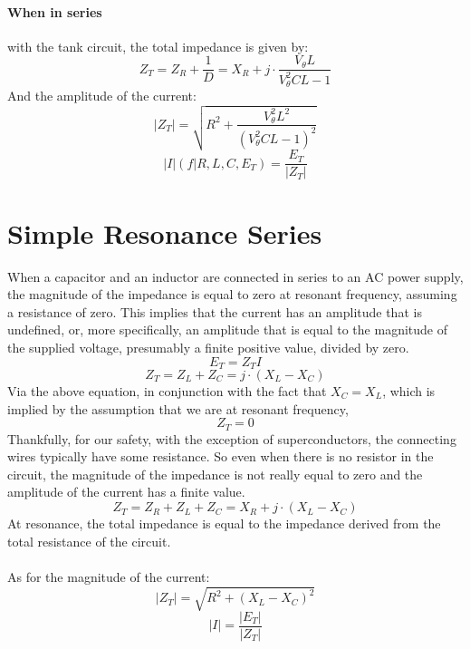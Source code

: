 \documentclass{article}
\begin{document}
	\paragraph[In Series]{When in series} with the tank circuit, the total 
	impedance is given by:
	$$ Z_T = Z_R + \frac{1}{D} = X_R  + j \cdot  \frac{V_\theta L}{V_\theta^2 
	CL -1}$$
	And the amplitude of the current:
	$$ |Z_T| = \sqrt{R^2 + \frac{V_\theta^2L^2}{(V_\theta^2CL - 1)^2}}$$
	$$ |I|(f \vert R, L, C, E_T) = \frac{E_T}{|Z_T|}$$
	\section[Series]{Simple Resonance Series}
	When a capacitor and an inductor are connected in series to an AC power 
	supply, the magnitude of the impedance is equal to zero at resonant 
	frequency, assuming a resistance of zero.  This implies that the current 
	has an amplitude that is undefined, or, more specifically, an amplitude 
	that is equal to the magnitude of the supplied voltage, presumably a finite 
	positive value, divided by zero.
	$$ E_T = Z_T I$$
	$$ Z_T = Z_L + Z_C = j \cdot (X_L - X_C)$$
	Via the above equation, in conjunction with the fact that $X_C=X_L$, which 
	is implied by the assumption that we are at resonant frequency,
	$$ Z_T = 0$$
	Thankfully, for our safety, with the exception of superconductors, the 
	connecting wires typically have some resistance.  So even when there is no 
	resistor in the circuit, the magnitude of the impedance is not really equal 
	to zero and the amplitude of the current has a finite value.
	$$  Z_T = Z_R + Z_L + Z_C = X_R + j\cdot (X_L - X_C)$$
	At resonance, the total impedance is equal to the impedance derived from 
	the total resistance of the circuit. \\ \\
	As for the magnitude of the current:
	\begin{equation}\label{eq:simple-series-magZ_T}
		|Z_T| = \sqrt{R^2 + (X_L-X_C)^2}
	\end{equation}
	$$ |I| = \frac{|E_T|}{|Z_T|}$$
\end{document}
